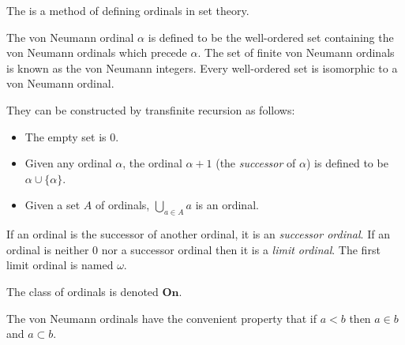 \documentclass[12pt]{article}
\begin{document}
The \emph{} is a method of defining ordinals in set theory.

The von Neumann ordinal $\alpha$ is defined to be the well-ordered set containing the von Neumann ordinals which precede $\alpha$.  The set of finite von Neumann ordinals is known as the von Neumann integers.  Every well-ordered set is isomorphic to a von Neumann ordinal.

They can be constructed by transfinite recursion as follows:

\begin{itemize}
\item The empty set is $0$.

\item Given any ordinal $\alpha$, the ordinal $\alpha+1$ (the \emph{successor} of $\alpha$) is defined to be $\alpha\cup\{\alpha\}$.

\item Given a set $A$ of ordinals, $\bigcup_{a\in A} a$ is an ordinal.

\end{itemize}

If an ordinal is the successor of another ordinal, it is an \emph{successor ordinal}.  If an ordinal is neither $0$ nor a successor ordinal then it is a \emph{limit ordinal}.  The first limit ordinal is named $\omega$.

The class of ordinals is denoted $\mathbf{On}$.

The von Neumann ordinals have the convenient property that if $a<b$ then $a\in b$ and $a\subset b$.
\end{document}
